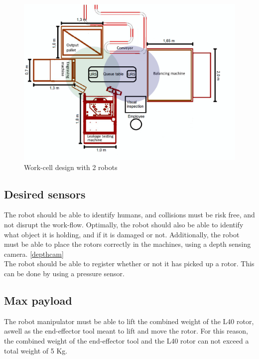 \begin{figure}[H]
    \centering
    \includegraphics[width=.5\textwidth]{Design/Work_cell_8.PNG}
    \caption{Work-cell design with 2 robots}
    \label{fig:workscell2arms}
\end{figure}



\subsection{Desired sensors}

The robot should be able to identify humans, and collisions must be risk free, and not disrupt the work-flow. Optimally, the robot should also be able to identify what object it is holding, and if it is damaged or not. Additionally, the robot must be able to place the rotors correctly in the machines, using a depth sensing camera. \ref{depthcam}\\
The robot should be able to register whether or not it has picked up a rotor. This can be done by using a pressure sensor.\\ 

\subsection{Max payload}
The robot manipulator must be able to lift the combined weight of the L40 rotor, aswell as the end-effector tool meant to lift and move the rotor. For this reason, the combined weight of the end-effector tool and the L40 rotor can not exceed a total weight of 5 Kg.\\


